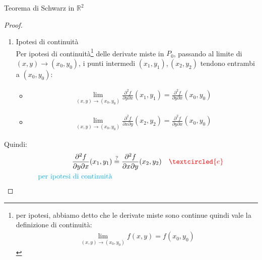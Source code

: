 \documentclass{article}  %
\begin{document}
\begin{theorem}{Teorema di Schwarz in $\mathbb{R}^2$}
\begin{proof}
\begin{enumerate}
			      \begin{align*}
				      \left[\frac{\partial^2 f}{\partial y \partial x}(x_1,y_1)\right](x-x_0)(y-y_0) = \left[ \frac{\partial^2f}{\partial x \partial y}(x_2,y_2) \right](x-x_0)(y-y_0)
			      \end{align*} \\
			      dividendo entrambi per $(x-x_0)(y-y_0) \neq 0$ ottengo:
			      \begin{align*}
				      \boxed{\frac{\partial^2 f}{\partial y \partial x}(x_1,y_1) = \frac{\partial^2f}{\partial x \partial y}(x_2,y_2)} \quad \textcolor{red}{\textcircled{e}}
			      \end{align*}
			\item Ipotesi di continuità \\
			      Per ipotesi di continuità\footnote{
				      per ipotesi, abbiamo detto che le derivate miste sono continue quindi vale la definizione di continuità:
				      \begin{align*}
					      \lim_{(x,y) \to (x_0,y_0)}f(x,y) = f(x_0,y_0)
				      \end{align*}
			      } delle derivate miste in $P_0$, passando al limite di $(x,y) \to (x_0,y_0)$, i punti intermedi $(x_1,y_1),(x_2,y_2)$ tendono entrambi a $(x_0,y_0)$:
			      \begin{itemize}
				      \item
				            \begin{align*}
					            \lim_{(x,y) \to (x_0,y_0)} \frac{\partial^2 f}{\partial y \partial x}(x_1,y_1) = \frac{\partial^2 f}{\partial y \partial x}(x_0,y_0)
				            \end{align*}
				      \item
				            \begin{align*}
					            \lim_{(x,y) \to (x_0,y_0)} \frac{\partial^2f}{\partial x \partial y}(x_2,y_2) = \frac{\partial^2 f}{\partial y \partial x}(x_0,y_0)
				            \end{align*}
			      \end{itemize}
		\end{enumerate}
		Quindi:
		\begin{align*}
			\frac{\partial^2 f}{\partial y \partial x}(x_1,y_1)                            & \overset{?}{=} \frac{\partial^2f}{\partial x \partial y}(x_2,y_2) \quad \textcolor{red}{\textcircled{e}} \\
			\textcolor{cyan}{\text{per ipotesi di continuità}}                                                                                                                                        \\

\end{align*}
\end{proof}
\end{theorem}
\end{document}
